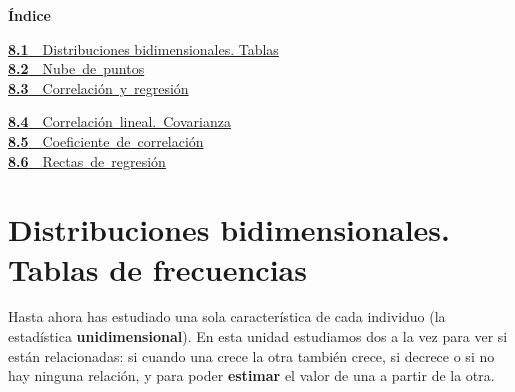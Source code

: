 \documentclass[11pt,a4paper]{article}
\makeatletter
\newcommand{\fmm}[1]{\setbox0=\hbox{$#1$}\ifdim\wd0>0.8\linewidth\def\fmmnext{\fmmdisp{#1}}\else\def\fmmnext{\mbox{\box0}}\fi\fmmnext}
\def\fmmdisp#1{\@ifnextchar.{\fmmdispp{#1}}{\@ifnextchar,{\fmmdispc{#1}}{\@ifnextchar;{\fmmdisps{#1}}{\fmdisp{#1}}}}}
\def\fmmdispp#1.{\fmdisp{#1\,.}}\def\fmmdispc#1,{\fmdisp{#1\,,}}\def\fmmdisps#1;{\fmdisp{#1\,;}}
\newcommand{\fmdisp}[1]{\[\setbox2=\hbox{$\displaystyle #1$}\ifdim\wd2>\linewidth\resizebox{\linewidth}{!}{\box2}\else\box2\fi\]}
\makeatother
\begin{document}
\begin{tcolorbox}[colback=fmsurface,colframe=fmsurface,arc=3mm,left=4mm,right=4mm,top=2mm,bottom=2mm]
\small\textbf{Índice}\par\smallskip
\begin{minipage}[t]{0.49\linewidth}\small \hyperlink{sec1}{\textbf{\color{fmgreen}8.1}\ \ Distribuciones bidimensionales. Tablas}\\[3pt]
\mbox{\hyperlink{sec2}{\textbf{\color{fmgreen}8.2}\ \ Nube de puntos}}\\[3pt]
\mbox{\hyperlink{sec3}{\textbf{\color{fmgreen}8.3}\ \ Correlación y regresión}}\\[3pt]\end{minipage}\hfill\begin{minipage}[t]{0.49\linewidth}\small \mbox{\hyperlink{sec4}{\textbf{\color{fmgreen}8.4}\ \ Correlación lineal. Covarianza}}\\[3pt]
\mbox{\hyperlink{sec5}{\textbf{\color{fmgreen}8.5}\ \ Coeficiente de correlación}}\\[3pt]
\mbox{\hyperlink{sec6}{\textbf{\color{fmgreen}8.6}\ \ Rectas de regresión}}\\[3pt]\end{minipage}
\end{tcolorbox}

\Needspace{6.2cm}
\section{Distribuciones bidimensionales. Tablas de frecuencias}\hypertarget{sec1}{}

Hasta ahora has estudiado una sola característica de cada individuo (la estadística \textbf{unidimensional}). En esta unidad estudiamos dos a la vez para ver si están relacionadas: si cuando una crece la otra también crece, si decrece o si no hay ninguna relación, y para poder \textbf{estimar} el valor de una a partir de la otra.

\end{document}
